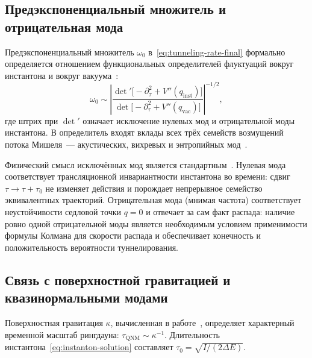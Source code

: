 \documentclass[12pt,a4paper,preprint]{elsarticle}
\begin{document}
        \subsection{Предэкспоненциальный множитель и отрицательная мода}\label{subsec:prefactor}
            Предэкспоненциальный множитель $\omega_{0}$ в~\eqref{eq:tunneling-rate-final} формально определяется отношением функциональных определителей флуктуаций вокруг инстантона и вокруг вакуума~\cite{ColemanS_AspectsOfSymmetry_1985}:
            \begin{equation}
                \omega_{0} \sim \left|\frac{\det'\bigl[-\partial_{\tau}^{2} + V''(q_{\mathrm{inst}})\bigr]}{\det\bigl[-\partial_{\tau}^{2} + V''(q_{\mathrm{vac}})\bigr]}\right|^{-1/2},
                \label{eq:prefactor-determinant}
            \end{equation}
            где штрих при $\det'$ означает исключение нулевых мод и отрицательной моды инстантона. В определитель входят вклады всех трёх семейств возмущений потока Мишеля~--- акустических, вихревых и энтропийных мод~\cite{SemyannikovAV_PerturbationSpectrumOfMichelFlowAcousticVorticalAndEntropyModes_2026}.
            
            Физический смысл исключённых мод является стандартным~\cite{ColemanS_AspectsOfSymmetry_1985}. Нулевая мода соответствует трансляционной инвариантности инстантона во времени: сдвиг $\tau \to \tau + \tau_{0}$ не изменяет действия и порождает непрерывное семейство эквивалентных траекторий. Отрицательная мода (мнимая частота) соответствует неустойчивости седловой точки $q = 0$ и отвечает за сам факт распада: наличие ровно одной отрицательной моды является необходимым условием применимости формулы Колмана для скорости распада и обеспечивает конечность и положительность вероятности туннелирования.

        \subsection{Связь с поверхностной гравитацией и квазинормальными модами}\label{subsec:kappa-connection}
            Поверхностная гравитация $\kappa$, вычисленная в работе~\cite{SemyannikovAV_AcousticGeometryAndSoundRayDynamicsInRelativisticSphericalAccretion_2026}, определяет характерный временной масштаб рингдауна: $\tau_{\mathrm{QNM}} \sim \kappa^{-1}$. Длительность инстантона~\eqref{eq:instanton-solution} составляет $\tau_{0} = \sqrt{I/(2\Delta E)}$.
            
\end{document}
